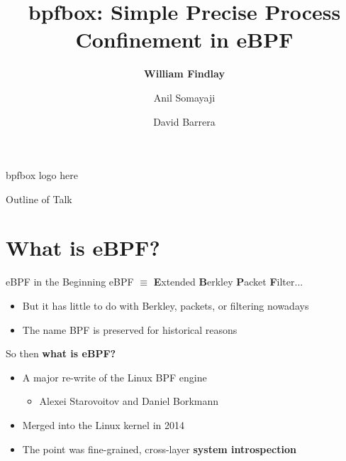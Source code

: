 \documentclass[12pt, dvipsnames]{beamer}
\title{bpfbox: Simple Precise Process Confinement in eBPF}
\author{\textbf{William Findlay} \and Anil Somayaji \and David Barrera}
\institute{Carleton University\\\href{mailto:will@ccsl.carleton.ca}{\ttfamily will@ccsl.carleton.ca}}
\begin{document}

\begin{frame}
\titlepage
\end{frame}

\setwatermark[hoffset=6cm, voffset=0.3cm]{}

\begin{frame}
    \begin{center}
        \Huge bpfbox logo here
    \end{center}
\end{frame}

\begin{frame}{Outline of Talk}
    \tableofcontents
\end{frame}

\section{What is eBPF?}

\begin{frame}[c]{eBPF in the Beginning}
eBPF $\equiv$ \textbf{E}xtended \textbf{B}erkley \textbf{P}acket \textbf{F}ilter...
\begin{itemize}
    \item But it has little to do with Berkley, packets, or filtering nowadays
    \item The name BPF is preserved for historical reasons
\end{itemize}
\vfill
So then \textbf{what is eBPF?}
\begin{itemize}
    \item A major re-write of the Linux BPF engine
    \begin{itemize}
        \item Alexei Starovoitov and Daniel Borkmann
    \end{itemize}
    \item Merged into the Linux kernel in 2014
    \item The point was fine-grained, cross-layer \textbf{system introspection}
\end{itemize}
\end{frame}
\end{document}
